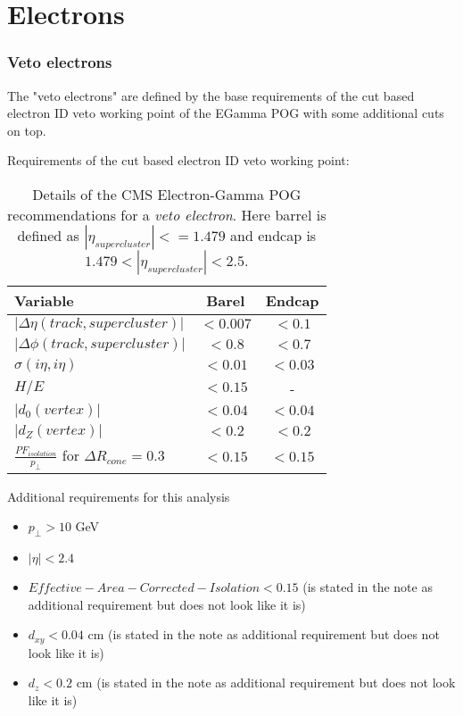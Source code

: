 
\section{Electrons}

\subsubsection{Veto electrons}

The "veto electrons" are defined by the base requirements of the cut based electron ID veto working point of the EGamma POG with some additional cuts on top. 
  
Requirements of the cut based electron ID veto working point:
 
\begin{table}[htp]
  
\begin{tabular}{|l|c|c|}
\hline
Variable & Barel & Endcap \\
\hline\hline
$| \Delta\eta(track,supercluster) |$ & $<0.007$ & $<0.1$  \\
$| \Delta\phi(track,supercluster) |$ & $<0.8  $ & $<0.7$  \\
$ \sigma(i\eta,i\eta)$               & $<0.01 $ & $<0.03$ \\
$H/E$                                & $<0.15 $ &       - \\
$|d_{0}(vertex)|$                    & $<0.04 $ & $<0.04$ \\
$|d_{Z}(vertex)|$                    & $<0.2  $ & $<0.2 $ \\
$\frac{PF_{isolation}}{p_{\perp}}$ for $ \Delta R_{cone}=0.3$  & $<0.15 $ & $<0.15$ \\
\hline
\end{tabular}
\caption{Details of the \gls{CMS} Electron-Gamma \gls{POG} recommendations for a \textit{veto electron}. Here barrel is defined as $ |\eta_{supercluster}|<=1.479 $ and endcap is $ 1.479 < |\eta_{supercluster}| < 2.5 $.} 
\end{table}

 
 
Additional requirements for this analysis
\begin{itemize}
  \item $ p_{\perp} > 10 $ GeV
  \item $ |\eta| < 2.4 $
  \item $ Effective-Area-Corrected-Isolation < 0.15 $ (is stated in the note as additional requirement but does not look like it is)
  \item $d_{xy}<0.04$ cm (is stated in the note as additional requirement but does not look like it is)
  \item $d_{z} < 0.2 $ cm (is stated in the note as additional requirement but does not look like it is)
\end{itemize}
 

